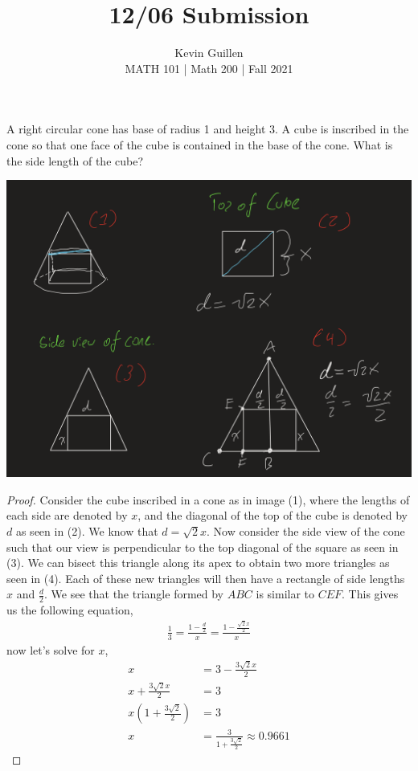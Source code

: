 \documentclass[11pt]{article}
\newenvironment{problem}[2][Problem\!]{\begin{trivlist}
\item[\hskip \labelsep {\bfseries #1}\hskip \labelsep {\bfseries #2}]}{\end{trivlist}}
\begin{document}
 
\title{12/06 Submission}
\author{Kevin Guillen\\[0.5em]
MATH 101  | Math 200 | Fall 2021}
\date{} 
\maketitle


\begin{tcolorbox}
    \begin{problem} {IC | 12-03 | PP 40}
        A right circular cone has base of radius 1 and height 3. A cube is inscribed in the cone so that one face of the cube is contained in the base of the cone. What is the side length of the cube?
    \end{problem}
\end{tcolorbox}
\includegraphics[scale=0.5]{diagram}
\begin{proof}
    Consider the cube inscribed in a cone as in image (1), where the lengths of each side are denoted by $x$, and the diagonal of the top of the cube is denoted by $d$ as seen in (2). We know that $d = \sqrt2 x$. Now consider the side view of the cone such that our view is perpendicular to the top diagonal of the square as seen in (3). We can bisect this triangle along its apex to obtain two more triangles as seen in (4). Each of these new triangles will then have a rectangle of side lengths $x$ and $\frac{d}{2}$. We see that the triangle formed by $ABC$ is similar to $CEF$. This gives us the following equation,
    \begin{align*}
        \frac{1}{3} = \frac{1-\frac{d}{2}}{x} = \frac{1- \frac{\sqrt2 x}{2}}{x}
    \end{align*}
    now let's solve for $x$,
    \begin{align}
        x &= 3 - \frac{3\sqrt2 x}{2}\\
        x + \frac{3\sqrt2 x}{2} &= 3 \\
        x(1 + \frac{3\sqrt 2}{2}) &= 3 \\
        x &= \frac{3}{1 + \frac{3\sqrt2}{2}} \approx 0.9661
    \end{align}
\end{proof}
\end{document}
